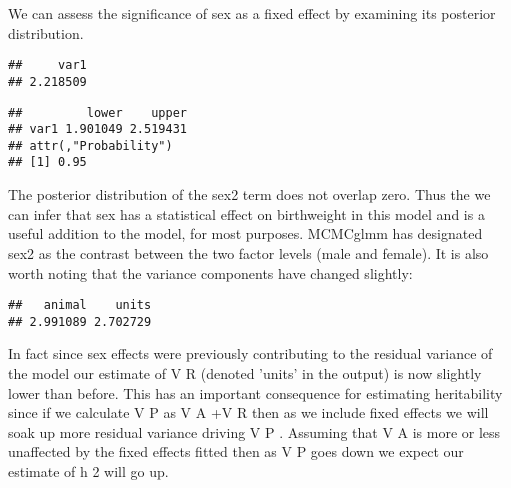 \documentclass[
  12pt,
]{book}
\newenvironment{Shaded}{\begin{snugshade}}{\end{snugshade}}
\newcommand{\FloatTok}[1]{\textcolor[rgb]{0.00,0.00,0.81}{#1}}
\newcommand{\FunctionTok}[1]{\textcolor[rgb]{0.00,0.00,0.00}{#1}}
\newcommand{\NormalTok}[1]{#1}
\newcommand{\SpecialCharTok}[1]{\textcolor[rgb]{0.00,0.00,0.00}{#1}}
\newcommand{\StringTok}[1]{\textcolor[rgb]{0.31,0.60,0.02}{#1}}
\begin{document}
We can assess the significance of sex as a fixed effect by examining its posterior distribution.

\begin{Shaded}
\end{Shaded}

\begin{verbatim}
##     var1 
## 2.218509
\end{verbatim}

\begin{Shaded}
\end{Shaded}

\begin{verbatim}
##         lower    upper
## var1 1.901049 2.519431
## attr(,"Probability")
## [1] 0.95
\end{verbatim}

The posterior distribution of the sex2 term does not overlap zero. Thus the we can infer that sex has a statistical effect on birthweight in this model and is a useful addition to the model, for most purposes. MCMCglmm has designated sex2 as the contrast between the two factor levels (male and female). It is also worth noting that the variance components have changed slightly:

\begin{Shaded}
\end{Shaded}

\begin{verbatim}
##   animal    units 
## 2.991089 2.702729
\end{verbatim}

In fact since sex effects were previously contributing to the residual variance of the model our estimate of V R (denoted 'units' in the output) is now slightly lower than before. This has an important consequence for estimating heritability since if we calculate V P as V A +V R then as we include fixed effects we will soak up more residual variance driving V P . Assuming that V A is more or less unaffected by the fixed effects fitted then as V P goes down we expect our estimate of h 2 will go up.
\end{document}
